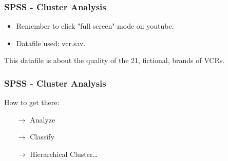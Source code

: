 \documentclass{beamer}
\begin{document}
\begin{frame}
\frametitle{SPSS - Cluster Analysis}
\Large
\begin{itemize} 
\item Remember to click "full screen" mode on youtube.
\item Datafile used: vcr.sav. 
\end{itemize}

This datafile is about the quality of the 21, fictional, brands of VCRs. 
\end{frame}
\begin{frame}
\frametitle{SPSS - Cluster Analysis}
\Large
How to get there: 

\begin{itemize}
\item[$\rightarrow$] Analyze
\item[$\rightarrow$] Classify 
\item[$\rightarrow$] Hierarchical Cluster… 
\end{itemize}
\end{frame}
\end{document}
